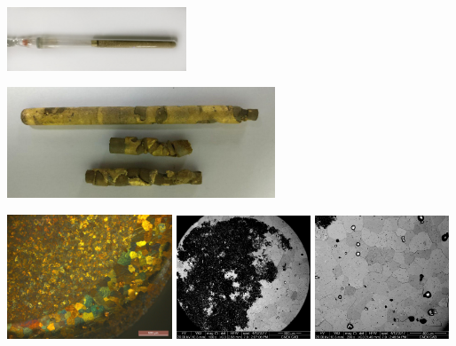 \documentclass[usenames,dvipsnames]{beamer}
\begin{document}
\begin{frame}
\begin{multicols}{2}
\includegraphics[width=0.4\textwidth]{img/proceso/ClavoPolvo.jpg}

\end{multicols}
 
 \end{frame}





\begin{frame}
\begin{center}
\includegraphics[width=0.60\textwidth]{img/tamgrano/Clavo1_Foto2.jpg} 
\end{center}



 \begin{multicols}{3}
\includegraphics[width=0.37\textwidth]{img/tamgrano/Clavo1.jpg}
\includegraphics[width=0.3\textwidth]{img/tamgrano/Clavo1Retro.jpg}
\includegraphics[width=0.3\textwidth]{img/tamgrano/Clavo1Retro2.jpg}
\end{multicols}
\end{frame}
\end{document}
